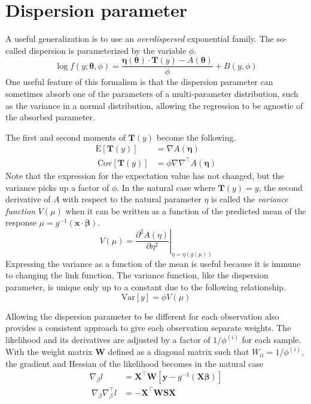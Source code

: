 \documentclass{article}
\newcommand{\bbeta}{\boldsymbol{\beta}}
\begin{document}
\section{Dispersion parameter}

A useful generalization is to use an \emph{overdispersed} exponential family. The
so-called dispersion is parameterized by the variable \(\phi\).
\[ \log f(y; \boldsymbol{\theta}, \phi) = \frac{\boldsymbol{\eta}(\boldsymbol{\theta})
		\cdot \mathbf{T}(y) - A(\boldsymbol{\theta})}{\phi} + B(y, \phi) \]
One useful feature of this formalism is that the dispersion parameter can
sometimes absorb one of the parameters of a multi-parameter distribution, such as
the variance in a normal distribution, allowing the regression to be agnostic of
the absorbed parameter.

The first and second moments of \(\mathbf{T}(y)\) become the following.
\begin{align}
	\textrm{E}[\mathbf{T}(y)]   & = \nabla A(\boldsymbol{\eta})                       \\\
	\textrm{Cov}[\mathbf{T}(y)] & = \phi \nabla \nabla^\intercal A(\boldsymbol{\eta})
\end{align}
Note that the expression for the expectation value has not changed, but the
variance picks up a factor of \(\phi\). In the natural case where
\(\mathbf{T}(y) = y\), the second derivative of \(A\) with respect to the
natural parameter \(\eta\) is called the \emph{variance function} \(V(\mu)\) when
it can be written as a function of the predicted mean of the response \(\mu =
g^{-1}(\mathbf{x}\cdot\bbeta)\).
\[ V(\mu) = \left. \frac{\partial^2 A(\eta)}{\partial \eta^2} \right|_{\eta = \eta(g(\mu))} \]
Expressing the variance as a function of the mean is useful because it is immune
to changing the link function.
The variance function, like the dispersion parameter, is unique only up to a
constant due to the following relationship.
\[ \textrm{Var}[y] = \phi V(\mu) \]

Allowing the dispersion parameter to be different for each observation also
provides a consistent approach to give each observation separate weights. The
likelihood and its derivatives are adjusted by a factor of \(1/\phi^{(i)}\)
for each sample. With the weight matrix \(\mathbf{W}\) defined as a diagonal
matrix such that \( W_{ii} = 1/\phi^{(i)} \), the gradient and Hessian
of the likelihood becomes in the natural case
\begin{align}
	\nabla_\beta l                        & = \mathbf{X}^\intercal \mathbf{W} \left[ \mathbf{y} -
		g^{-1}(\mathbf{X}\bbeta) \right]                                                                  \\\
	\nabla_\beta \nabla_\beta^\intercal l & = - \mathbf{X}^\intercal \mathbf{W} \mathbf{S} \mathbf{X}
\end{align}
\end{document}
